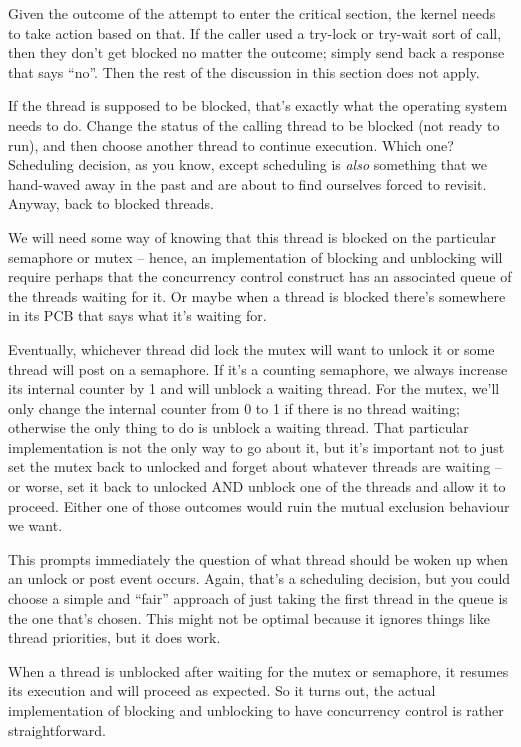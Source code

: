 Given the outcome of the attempt to enter the critical section, the kernel needs to take action based on that. If the caller used a try-lock or try-wait sort of call, then they don't get blocked no matter the outcome; simply send back a response that says ``no''. Then the rest of the discussion in this section does not apply.

If the thread is supposed to be blocked, that's exactly what the operating system needs to do. Change the status of the calling thread to be blocked (not ready to run), and then choose another thread to continue execution. Which one? Scheduling decision, as you know, except scheduling is \textit{also} something that we hand-waved away in the past and are about to find ourselves forced to revisit. Anyway, back to blocked threads.

We will need some way of knowing that this thread is blocked on the particular semaphore or mutex -- hence, an implementation of blocking and unblocking will require perhaps that the concurrency control construct has an associated queue of the threads waiting for it. Or maybe when a thread is blocked there's somewhere in its PCB that says what it's waiting for. 

Eventually, whichever thread did lock the mutex will want to unlock it or some thread will post on a semaphore. If it's a counting semaphore, we always increase its internal counter by 1 and will unblock a waiting thread. For the mutex, we'll only change the internal counter from 0 to 1 if there is no thread waiting; otherwise the only thing to do is unblock a waiting thread. That particular implementation is not the only way to go about it, but it's important not to just set the mutex back to unlocked and forget about whatever threads are waiting -- or worse, set it back to unlocked AND unblock one of the threads and allow it to proceed. Either one of those outcomes would ruin the mutual exclusion behaviour we want.

This prompts immediately the question of what thread should be woken up when an unlock or post event occurs. Again, that's a scheduling decision, but you could choose a simple and ``fair'' approach of just taking the first thread in the queue is the one that's chosen. This might not be optimal because it ignores things like thread priorities, but it does work. 

When a thread is unblocked after waiting for the mutex or semaphore, it resumes its execution and will proceed as expected. So it turns out, the actual implementation of blocking and unblocking to have concurrency control is rather straightforward. 

